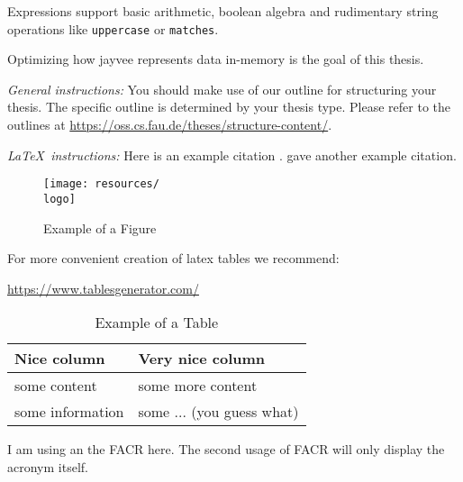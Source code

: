 Expressions support basic arithmetic, boolean algebra and rudimentary string operations like \Verb|uppercase| or \Verb|matches|.




Optimizing how jayvee represents data in-memory is the goal of this thesis.

	{\textsl{General instructions:}}
You should make use of our outline for structuring your
thesis. The specific outline is determined by your thesis type.
Please refer to the outlines at
\url{https://oss.cs.fau.de/theses/structure-content/}.

{\textsl{\LaTeX\ instructions:}} Here is an example citation
\autocite{riehle:2011:controlling}.
\textcite{riehle:2007:economic} gave another example citation.

\begin{figure}[ht]
	\texttt{[image: resources/\\logo]}
	\caption{Example of a Figure}
	\label{fig:example}
\end{figure}

For more convenient creation of latex tables we recommend:

\url{https://www.tablesgenerator.com/}

\begin{table}[ht]
	\caption{Example of a Table}
	\label{tab:example}
	\begin{tabular}{|l|l|}
		\hline
		Nice column      & Very nice column          \\
		\hline
		some content     & some more content         \\
		some information & some ... (you guess what) \\
		\hline
	\end{tabular}
\end{table}

I am using an the \ac{FACR} here. The second usage of \ac{FACR} will only display the acronym itself.
